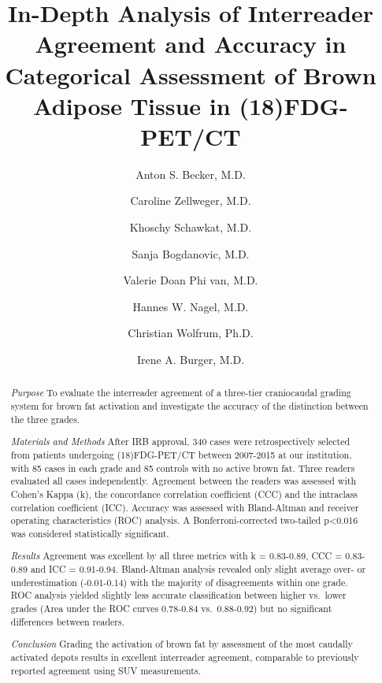 \documentclass[]{elsarticle} %
\begin{document}
\begin{frontmatter}

  \title{In-Depth Analysis of Interreader Agreement and Accuracy in Categorical
Assessment of Brown Adipose Tissue in (18)FDG-PET/CT}
    \author[University Hospital of Zurich]{Anton S. Becker, M.D.}
    \author[University Hospital of Zurich]{Caroline Zellweger, M.D.}
  
  
    \author[University Hospital of Zurich]{Khoschy Schawkat, M.D.}
  
  
    \author[University Hospital of Zurich]{Sanja Bogdanovic, M.D.}
  
  
    \author[University Hospital of Zurich]{Valerie Doan Phi van, M.D.}
  
  
    \author[University Hospital of Zurich]{Hannes W. Nagel, M.D.}
  
  
    \author[ETH Zurich]{Christian Wolfrum, Ph.D.}
  
  
    \author[University Hospital of Zurich]{Irene A. Burger, M.D.}
  
  
      \address[University Hospital of Zurich]{University Hospital of Zurich, Raemistrasse 100, Zurich, Switzerland}
    \address[ETH Zurich]{ETH Zurich, Universitaetsstrasse 2, 8092 Zurich}
  
  \begin{abstract}
  \emph{Purpose} To evaluate the interreader agreement of a three-tier
  craniocaudal grading system for brown fat activation and investigate the
  accuracy of the distinction between the three grades.
  
  \emph{Materials and Methods} After IRB approval, 340 cases were
  retrospectively selected from patients undergoing (18)FDG-PET/CT between
  2007-2015 at our institution, with 85 cases in each grade and 85
  controls with no active brown fat. Three readers evaluated all cases
  independently. Agreement between the readers was assessed with Cohen's
  Kappa (k), the concordance correlation coefficient (CCC) and the
  intraclass correlation coefficient (ICC). Accuracy was assessed with
  Bland-Altman and receiver operating characteristics (ROC) analysis. A
  Bonferroni-corrected two-tailed p\textless{}0.016 was considered
  statistically significant.
  
  \emph{Results} Agreement was excellent by all three metrics with k =
  0.83-0.89, CCC = 0.83-0.89 and ICC = 0.91-0.94. Bland-Altman analysis
  revealed only slight average over- or underestimation (-0.01-0.14) with
  the majority of disagreements within one grade. ROC analysis yielded
  slightly less accurate classification between higher vs.~lower grades
  (Area under the ROC curves 0.78-0.84 vs.~0.88-0.92) but no significant
  differences between readers.
  
  \emph{Conclusion} Grading the activation of brown fat by assessment of
  the most caudally activated depots results in excellent interreader
  agreement, comparable to previously reported agreement using SUV
  measurements.
  \end{abstract}
  
 \end{frontmatter}
\end{document}
